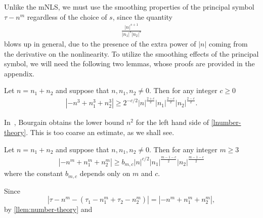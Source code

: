 %
%
Unlike the mNLS, we must use the smoothing properties of the
principal symbol $\tau - n^m$ regardless of the choice of $s$, since the quantity
%
%
\begin{equation}
	\label{lconvo-multiplier}
	\begin{split}
		\frac{|n|^{s+1}}{|n_1|^s |n_2|^s }
	\end{split}
\end{equation}
%
%
blows up in general, due to the presence of the extra power of $|n|$ coming from the derivative on
the nonlinearity. To utilize the smoothing effects of the principal symbol, we
will need the following two lemmas, whose
proofs are provided in the appendix.
%
%
%
\begin{lemma}
	\label{llem:number-theory1}
	Let $n=n_1 + n_2$ and suppose that $n, n_1, n_2\neq
	0$. Then for any integer $c \ge 0$
%
%
\begin{equation}
	\begin{split}
		\label{lnumber-theory1}
		| - n^{3} + n_1^3 + n_2^3| \ge 2^{-c/2} | n |^{\frac{2+c}{2}} | n_{1}
		|^{\frac{2-c}{2}}| n_2 |^{\frac{2-c}{2}}.
	\end{split}
\end{equation}
%
%
\end{lemma}
%
%
\begin{remark}
	In~\cite{Bourgain:1993ju}, Bourgain obtains the lower bound $n^2$ for
	the left hand side of \eqref{lnumber-theory}. This is too coarse an estimate,
	as we shall see.
\end{remark}
%
%
%
%
\begin{lemma}
	\label{llem:number-theory}
	Let $n=n_1 + n_2$ and suppose that $n, n_1, n_2\neq
	0$. Then for any integer  $m \ge 3$
%
%
\begin{equation}
	\begin{split}
		\label{lnumber-theory}
		| - n^{m} + n_1^{m} + n_2^{m }| \ge b_{m, c } 
		|n|^{c/2} |n_1|^{\frac{m-1-c}{2}} | n_2 |^{\frac{m-1-c}{2}}
		\end{split}
\end{equation}
%
%
where the constant $b_{m,c}$ depends only on $m$ and $c$. 
\end{lemma}
%
%
%
%
%
%
Since $$| \tau - n^{m} - \left( \tau_1 - n_1^{m} 
+ \tau_2 - n_2^{m }  \right ) | = | - n^{m} + n_1^{m} +
n_2^{m }|,$$ by \cref{llem:number-theory} and
